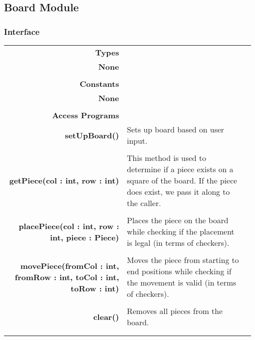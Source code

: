 \documentclass[10pt]{article}
\makeatletter
\newcommand{\CustomLabel}[1]{\Hy@raisedlink{\hypertarget{#1}{}}\label{#1}}
\makeatother
\begin{document}
        
        
        
        
    \subsection{Board Module}\CustomLabel{mis:Board}
    \subsubsection{Interface}
        \begin{tabularx}{\linewidth}{@{} >{\bfseries}r Xp{5cm} }
            Types           & \begin{tabular}[t]{@{} l p{8cm}} 
                                     & \\
                                    None & \\
                              \end{tabular} \\
                              
            Constants       & \begin{tabular}[t]{@{} l p{8cm}} 
                                     & \\
                                    None & \\
                              \end{tabular} \\

            Access Programs & \begin{tabular}[t]{@{} p{4cm} p{8cm}}
                                     & \\
                                    setUpBoard() & Sets up board based on user input. \\
                                     & \\
                                    getPiece(col : int, row : int)& This method is used to determine if a piece exists on a square of the board. If the piece does exist, we pass it along to the caller. \\ 
                                     & \\
                                    placePiece(col : int, row : int, piece : Piece) & Places the piece on the board while checking if the placement is legal (in terms of checkers). \\
                                     & \\
                                    movePiece(fromCol : int, fromRow : int, toCol : int, toRow : int) & Moves the piece from starting to end positions while checking if the movement is valid (in terms of checkers). \\
                                     & \\
                                    clear() & Removes all pieces from the board. \\
                                     & \\
                             \end{tabular}
        \end{tabularx}
        
\end{document}
